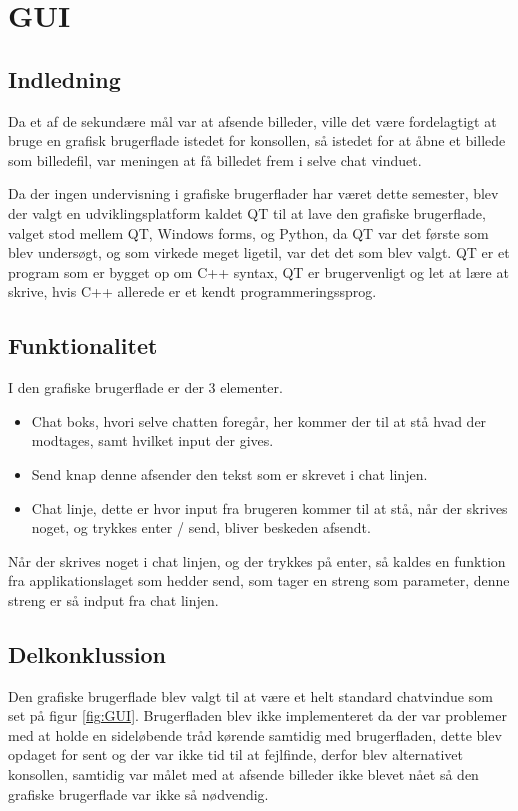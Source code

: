 \section{GUI}

\subsection{Indledning}
Da et af de sekundære mål var at afsende billeder, ville det være fordelagtigt at bruge en grafisk brugerflade istedet for konsollen, så istedet for at åbne et billede som billedefil, var meningen at få billedet frem i selve chat vinduet.

Da der ingen undervisning i grafiske brugerflader har været dette semester, blev der valgt en udviklingsplatform kaldet QT til at lave den grafiske brugerflade, valget stod mellem QT, Windows forms, og Python, da QT var det første som blev undersøgt, og som virkede meget ligetil, var det det som blev valgt.
QT er et program som er bygget op om C++ syntax, QT er brugervenligt og let at lære at skrive, hvis C++ allerede er et kendt programmeringssprog.\\
\subsection{Funktionalitet}

I den grafiske brugerflade er der 3 elementer.
\begin{itemize}
	\item Chat boks, hvori selve chatten foregår, her kommer der til at stå hvad der modtages, samt hvilket input der gives.
	\item Send knap denne afsender den tekst som er skrevet i chat linjen.
	\item Chat linje, dette er hvor input fra brugeren kommer til at stå, når der skrives noget, og trykkes enter / send, bliver beskeden afsendt.
\end{itemize}

Når der skrives noget i chat linjen, og der trykkes på enter, så kaldes en funktion fra applikationslaget som hedder send, som tager en streng som parameter, denne streng er så indput fra chat linjen.

\subsection{Delkonklussion}
Den grafiske brugerflade blev valgt til at være et helt standard chatvindue som set på figur \ref{fig:GUI}.
Brugerfladen blev ikke implementeret da der var problemer med at holde en sideløbende tråd kørende samtidig med brugerfladen, dette blev opdaget for sent og der var ikke tid til at fejlfinde, derfor blev alternativet konsollen, samtidig var målet med at afsende billeder ikke blevet nået så den grafiske brugerflade var ikke så nødvendig.




